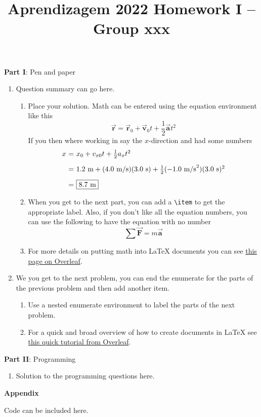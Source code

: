 \documentclass[12pt]{article}
\title{\large{Aprendizagem 2022}\vskip 0.2cm Homework I -- Group xxx}
\date{}
\begin{document}
\maketitle
\center\large{\vskip -2.5cm\textbf{Part I}: Pen and paper}
\begin{enumerate}[leftmargin=\labelsep]
\item Question summary can go here.
    \begin{enumerate}
    \item Place your solution. Math can be entered using the equation
    environment like this
    \begin{equation}
        \vec{\mathbf{r}} = \vec{\mathbf{r}}_{0} + \vec{\mathbf{v}}_{0}t + \frac{1}{2}\vec{\mathbf{a}}t^{2}
    \end{equation}
    If you then where working in say the $x$-direction and had some numbers %
    \begin{equation}
    \begin{array}{r@{~=~}l}
    x & x_{0} + v_{x0}t + \frac{1}{2}a_{x}t^{2} \\ [2ex]
    & 1.2~\text{m} + (4.0~\text{m/s})(3.0~\text{s}) + \frac{1}{2}(-1.0~\text{m/s}^{2})(3.0~\text{s})^{2}\\ [2ex]
    & \boxed{8.7~\text{m}}
    \end{array}
    \end{equation}

    \item When you get to the next part, you can add a \verb"\item" to get the appropriate label. Also,
    if you don't like all the equation numbers, you can use the following to have the equation with
    no number
    \begin{equation*}
    \sum\vec{\mathbf{F}} = m\vec{\mathbf{a}}
    \end{equation*}

    \item For more details on putting math into {\LaTeX} documents you can see 
    \href{https://www.overleaf.com/learn/latex/Mathematical_expressions}{this page on Overleaf}.
    \end{enumerate}

\item We you get to the next problem, you can end the enumerate for the parts of the previous problem and then add another item.
    \begin{enumerate}
    \item Use a nested enumerate environment to label the parts of the next problem.
    \item For a quick and broad overview of how to create documents in {\LaTeX} see 
    \href{https://www.overleaf.com/learn/latex/Learn_LaTeX_in_30_minutes}{this quick tutorial from Overleaf}.
    \end{enumerate}
\end{enumerate}

\center\large{\textbf{Part II}: Programming}

\begin{enumerate}[leftmargin=\labelsep,resume]
\item Solution to the programming questions here.
\end{enumerate}

\center\large{\textbf{Appendix}\vskip 0.3cm}

Code can be included here.
\end{document}
